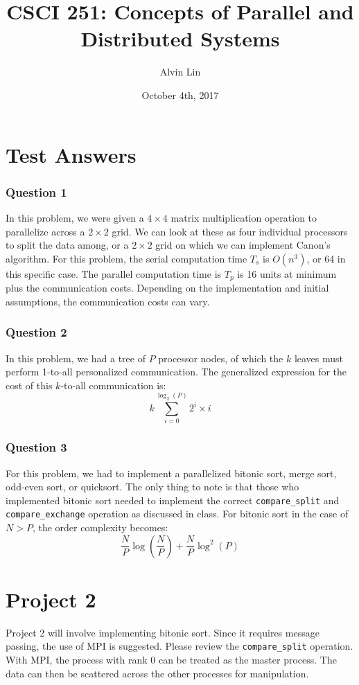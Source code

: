 \documentclass[letterpaper, 12pt]{math}
\title{CSCI 251: Concepts of Parallel and Distributed Systems}
\author{Alvin Lin}
\date{October 4th, 2017}
\begin{document}
\maketitle

\section*{Test Answers}

\subsubsection*{Question 1}
In this problem, we were given a \( 4\times4 \) matrix multiplication operation
to parallelize across a \( 2\times2 \) grid. We can look at these as four
individual processors to split the data among, or a \( 2\times2 \) grid on which
we can implement Canon's algorithm. For this problem, the serial computation
time \( T_s \) is \( O(n^3) \), or 64 in this specific case. The parallel
computation time is \( T_p \) is 16 units at minimum plus the communication
costs. Depending on the implementation and initial assumptions, the
communication costs can vary.

\subsubsection*{Question 2}
In this problem, we had a tree of \( P \) processor nodes, of which the
\( k \) leaves must perform 1-to-all personalized communication. The
generalized expression for the cost of this \( k \)-to-all communication is:
\[ k\sum_{i=0}^{\log_2(P)}2^i\times i \]

\subsubsection*{Question 3}
For this problem, we had to implement a parallelized bitonic sort, merge sort,
odd-even sort, or quicksort. The only thing to note is that those who
implemented bitonic sort needed to implement the correct \texttt{compare\_split}
and \texttt{compare\_exchange} operation as discussed in class. For bitonic
sort in the case of \( N > P \), the order complexity becomes:
\[ \frac{N}{P}\log(\frac{N}{P})+\frac{N}{P}\log^2(P) \]

\section*{Project 2}
Project 2 will involve implementing bitonic sort. Since it requires message
passing, the use of MPI is suggested. Please review the \texttt{compare\_split}
operation. With MPI, the process with rank 0 can be treated as the master
process. The data can then be scattered across the other processes for
manipulation.
\end{document}
